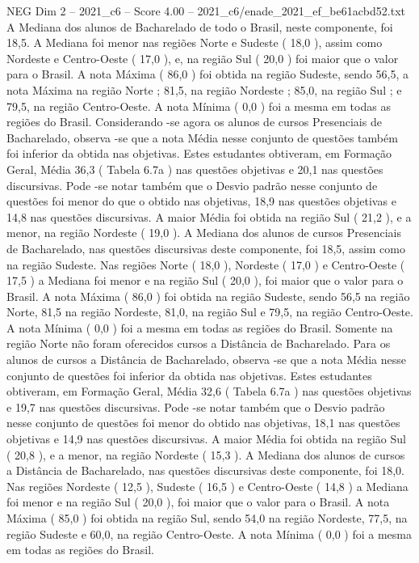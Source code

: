 \begin{textsample}{NEG Dim 2 – 2021\_c6 – Score 4.00 – 2021\_c6/enade\_2021\_ef\_be61acbd52.txt}
A Mediana dos alunos de Bacharelado de todo o Brasil, neste componente, foi 18,5.
A Mediana foi menor nas regiões Norte e Sudeste ( 18,0 ), assim como Nordeste e Centro-Oeste ( 17,0 ), e, na região Sul ( 20,0 ) foi maior que o valor para o Brasil.
A nota Máxima ( 86,0 ) foi obtida na região Sudeste, sendo 56,5, a nota Máxima na região Norte ; 81,5, na região Nordeste ; 85,0, na região Sul ; e 79,5, na região Centro-Oeste.
A nota Mínima ( 0,0 ) foi a mesma em todas as regiões do Brasil.
Considerando -se agora os alunos de cursos Presenciais de Bacharelado, observa -se que a nota Média nesse conjunto de questões também foi inferior da obtida nas objetivas.
Estes estudantes obtiveram, em Formação Geral, Média 36,3 ( Tabela 6.7a ) nas questões objetivas e 20,1 nas questões discursivas.
Pode -se notar também que o Desvio padrão nesse conjunto de questões foi menor do que o obtido nas objetivas, 18,9 nas questões objetivas e 14,8 nas questões discursivas.
A maior Média foi obtida na região Sul ( 21,2 ), e a menor, na região Nordeste ( 19,0 ).
A Mediana dos alunos de cursos Presenciais de Bacharelado, nas questões discursivas deste componente, foi 18,5, assim como na região Sudeste.
Nas regiões Norte ( 18,0 ), Nordeste ( 17,0 ) e Centro-Oeste ( 17,5 ) a Mediana foi menor e na região Sul ( 20,0 ), foi maior que o valor para o Brasil.
A nota Máxima ( 86,0 ) foi obtida na região Sudeste, sendo 56,5 na região Norte, 81,5 na região Nordeste, 81,0, na região Sul e 79,5, na região Centro-Oeste.
A nota Mínima ( 0,0 ) foi a mesma em todas as regiões do Brasil.
Somente na região Norte não foram oferecidos cursos a Distância de Bacharelado.
Para os alunos de cursos a Distância de Bacharelado, observa -se que a nota Média nesse conjunto de questões foi inferior da obtida nas objetivas.
Estes estudantes obtiveram, em Formação Geral, Média 32,6 ( Tabela 6.7a ) nas questões objetivas e 19,7 nas questões discursivas.
Pode -se notar também que o Desvio padrão nesse conjunto de questões foi menor do obtido nas objetivas, 18,1 nas questões objetivas e 14,9 nas questões discursivas.
A maior Média foi obtida na região Sul ( 20,8 ), e a menor, na região Nordeste ( 15,3 ).
A Mediana dos alunos de cursos a Distância de Bacharelado, nas questões discursivas deste componente, foi 18,0.
Nas regiões Nordeste ( 12,5 ), Sudeste ( 16,5 ) e Centro-Oeste ( 14,8 ) a Mediana foi menor e na região Sul ( 20,0 ), foi maior que o valor para o Brasil.
A nota Máxima ( 85,0 ) foi obtida na região Sul, sendo 54,0 na região Nordeste, 77,5, na região Sudeste e 60,0, na região Centro-Oeste.
A nota Mínima ( 0,0 ) foi a mesma em todas as regiões do Brasil.

\end{textsample}
